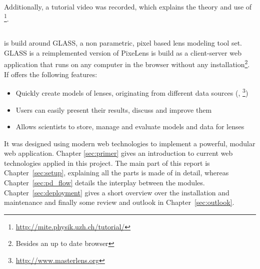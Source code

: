 Additionally, a tutorial video was recorded, which explains the theory and use of \spl\footnote{\protect\url{http://mite.physik.uzh.ch/tutorial/}}.



\subsection{\spl}

\spl is build around GLASS\cite{glass-jc}, a non parametric, pixel based lens modeling tool set.
GLASS is a reimplemented version of PixeLens\cite{pixelens}
%
\spl is build as a client-server web application that runs on any computer in the browser without any installation\footnote{Besides an up to date browser}.
If offers the following features:
\begin{itemize}
  \item Quickly create models of lenses, originating from different data sources (\sw, \ml \footnote{\protect\url{http://www.masterlens.org}})
  \item Users can easily present their results, discuss and improve them
  \item Allows scientists to store, manage and evaluate models and data for lenses
\end{itemize}

It was designed using modern web technologies to implement a powerful, modular web application.
Chapter \ref{sec:primer} gives an introduction to current web technologies applied in this project.
The main part of this report is Chapter~\ref{sec:setup}, explaining all the parts \spl is made of in detail, whereas Chapter~\ref{sec:pd_flow} details the interplay between the modules.
Chapter~\ref{sec:deployment} gives a short overview over the installation and maintenance and finally some review and outlook in Chapter~\ref{sec:outlook}.


